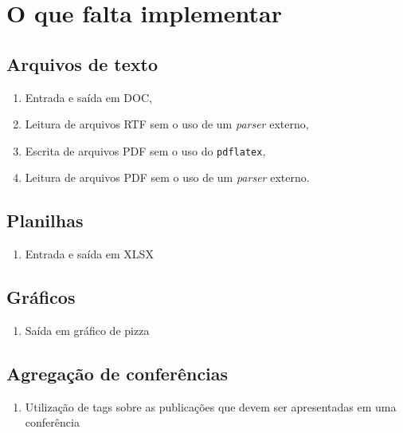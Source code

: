 \section{O que falta implementar}
\subsection{Arquivos de texto}
\begin{enumerate}
\item Entrada e saída em DOC,
\item Leitura de arquivos RTF sem o uso de um \textit{parser} externo,
\item Escrita de arquivos PDF sem o uso do \verb|pdflatex|,
\item Leitura de arquivos PDF sem o uso de um \textit{parser} externo.
\end{enumerate}

\subsection{Planilhas}
\begin{enumerate}
\item Entrada e saída em XLSX
\end{enumerate}

\subsection{Gráficos}
\begin{enumerate}
\item Saída em gráfico de pizza
\end{enumerate}

\subsection{Agregação de conferências}
\begin{enumerate}
\item Utilização de tags sobre as publicações que devem ser apresentadas em uma conferência
\end{enumerate}
